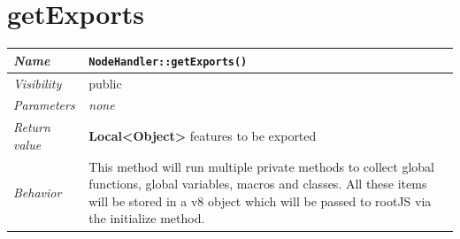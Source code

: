 \section{getExports}
\begin{longtable}{p{3cm} @{\hskip 1cm} p{12cm}}
 \hline
\textit{Name} & \texttt{NodeHandler::getExports()}\\
\hline
 \textit{Visibility} & public\\
\hline
\textit{Parameters} & \textit{none}\\
\hline
\textit{Return value} & \textbf{Local<Object>} features to be exported \\
  \hline
 \textit{Behavior} & This method will run multiple private methods to collect global functions, global variables, macros and classes.
 All these items will be stored in a v8 object which will be passed to rootJS via the initialize method. \\
\hline
\end{longtable} \pagebreak
